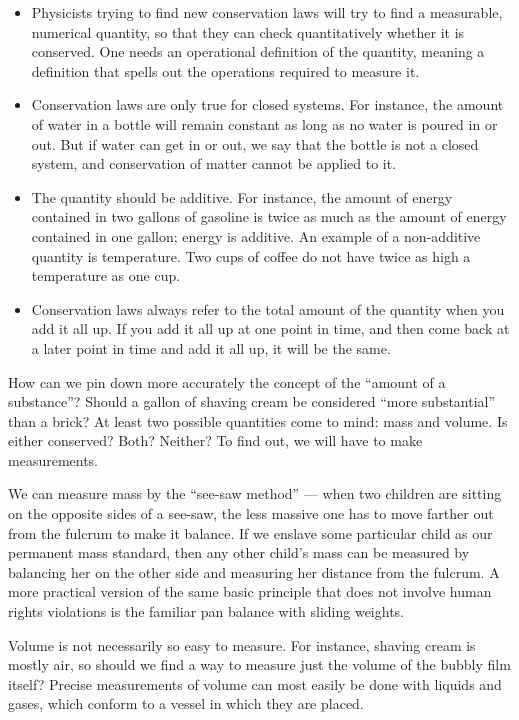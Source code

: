 \begin{itemize}
\item[] Physicists trying to find new conservation laws will try
to find a measurable, numerical quantity, so that they can
check quantitatively whether it is conserved.  One needs an
operational definition of the quantity, meaning a definition
that spells out the operations required to measure it.

\item[] Conservation laws are only true for closed systems.  For
instance, the amount of water in a bottle will remain
constant as long as no water is poured in or out.  But if
water can get in or out, we say that the bottle is not a
closed system, and conservation of matter cannot be applied to it.

\item[] The quantity should be additive.  For instance, the amount
of energy contained in two gallons of gasoline is twice as
much as the amount of energy contained in one gallon; energy
is additive.  An example of a non-additive quantity is
temperature.  Two cups of coffee do not have twice as high a
temperature as one cup.

\item[] Conservation laws always refer to the total amount of the
quantity when you add it all up.  If you add it all up at
one point in time, and then come back at a later point in
time and add it all up, it will be the same.
\end{itemize}

How can we pin down more accurately the concept of the
``amount of a substance''?  Should a gallon of shaving cream
be considered ``more substantial'' than a brick? At least
two possible quantities come to mind: mass and volume.  Is
either conserved?  Both?  Neither?  To find out, we will
have to make measurements.

We can measure mass by the ``see-saw method'' --- when two
children are sitting on the opposite sides of a see-saw, the
less massive one has to move farther out from the fulcrum to
make it balance.  If we enslave some particular child as our
permanent mass standard, then any other child's mass can
be measured by balancing her on the other side and
measuring her distance from the fulcrum.  A more practical
version of the same basic principle that does not involve
human rights violations is the familiar pan balance
with sliding weights.

Volume is not necessarily so easy to measure.  For instance,
shaving cream is mostly air, so should we find a way to
measure just the volume of the bubbly film itself?  Precise
measurements of volume can most easily be done with liquids
and gases, which conform to a vessel in which they are placed.

